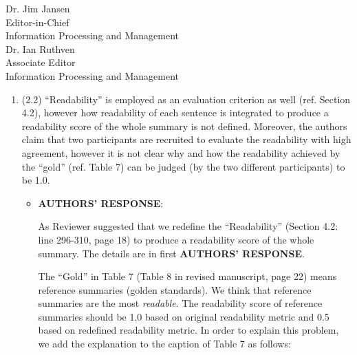 \documentclass[11pt]{letter} %
\begin{document}
\begin{letter}{Dr. Jim Jansen \\
			Editor-in-Chief  \\
			Information Processing and Management\\
			Dr. Ian Ruthven \\
			Associate Editor \\
			Information Processing and Management}
\begin{enumerate}
\begin{itemize}
\begin{itemize}
				\begin{equation}
				\small Rep_{ngram} = \frac{n_{ngram}}{N_{ngram}} \nonumber
				\end{equation}
				where $n_{ngram}$ is the number of repeated N-grams, 
				$N_{ngram}$ is the total number of N-grams in a summary.
				\item[-] \textbf{Sentence repeatedness} is the percentage of repeated 
				sentences in a summary:
				\begin{equation}
				\small Rep_{sent} = \frac{n_{sent}}{N_{sent}} \nonumber
				\end{equation}
				where $n_{sent}$ is the number of repeated sentences, 
				$N_{sent}$ is the total number of sentences in a summary.
				For sentence repeatedness, if the sentences contain the same trigram,
				these sentence are repetitve sentences.
				(Here we insert a footnote 
				`Any two sentences in one reference summary almost never contain 
				the same trigram (Paulus et al., 2017).')
				\item[-] 
				\textbf{Total repeatedness} (Algorithm 1, page 17) is a comprehensive score
				that unifies word-level and sentence-level repeatedness.
				It is not computed by N-gram repeatedness score 
				and sentence repeatedness score. 
				\end{itemize}
				''
				(Section 4.2: line 265-276, page 16)
			\end{itemize}
			\item (2.2) ``Readability'' is employed as an evaluation criterion as well (ref. Section 4.2), however how readability of each sentence is integrated to produce a readability score of the whole summary is not defined. Moreover, the authors claim that two participants are recruited to evaluate the readability with high agreement, however it is not clear why and how the readability achieved by the ``gold'' (ref. Table 7) can be judged (by the two different participants) to be 1.0.
			\begin{itemize}
				\item[] \textbf{AUTHORS' RESPONSE}:  
			
		    	As Reviewer suggested that we redefine the ``Readability'' (Section 4.2: line 296-310, page 18)
				to produce a readability score of the whole summary. 
				The details are in first \textbf{AUTHORS' RESPONSE}.

			    \hspace*{0.6cm}
                The ``Gold'' in Table 7 (Table $8$ in revised manuscript, page 22) means reference summaries (golden standards). We think that
				reference summaries are the most \textit{readable}. The readability score of reference summaries
				should be 1.0 based on original readability metric 
				and 0.5 based on redefined readability metric. 
				In order to explain this problem, we add the explanation to the caption of Table 7
				as follows:
			    

\end{itemize}
\end{enumerate}
\end{letter}
\end{document}
